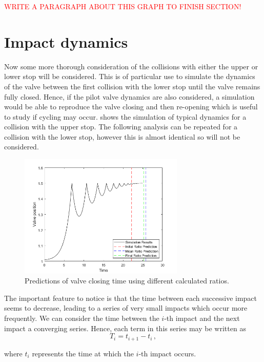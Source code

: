 \textcolor{Red}{WRITE A PARAGRAPH ABOUT THIS GRAPH TO FINISH SECTION!}

\newpage
\section{Impact dynamics} \label{sec: ImpactDynamics}

Now some more thorough consideration of the collisions with either the upper or lower stop will be considered. This is of particular use to simulate the dynamics of the valve between the first collision with the lower stop until the valve remains fully closed. Hence, if the pilot valve dynamics are also considered, a simulation would be able to reproduce the valve closing and then re-opening which is useful to study if cycling may occur.  shows the simulation of typical dynamics for a collision with the upper stop. The following analysis can be repeated for a collision with the lower stop, however this is almost identical so will not be considered.
~
\begin{figure}[ht]
    \centering
    \includegraphics[width=0.7\textwidth]{Figures/ImpactSeries/PositionTime.png}
    \caption{Predictions of valve closing time using different calculated ratios.}
    \label{fig: ImpactPos}
\end{figure}

The important feature to notice is that the time between each successive impact seems to decrease, leading to a series of very small impacts which occur more frequently. We can consider the time between the $i$-th impact and the next impact a converging series. Hence, each term in this series may be written as
~
\begin{equation*}
    T_i = t_{i+1} - t_{i} \, ,
\end{equation*}

where $t_i$ represents the time at which the $i$-th impact occurs.

